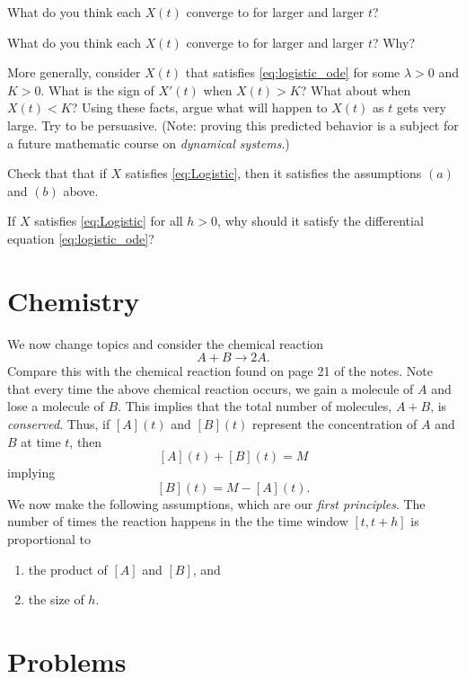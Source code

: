 What do you think each $X(t)$ converge to for larger and larger $t$?



\bigskip

\problemfont
\problem What do you think each $X(t)$ converge to for larger and
larger $t$?  Why?

\problem More generally, consider $X(t)$ that satisfies
\eqref{eq:logistic_ode} for some $\lambda> 0$ and $K>0$.  What is the
sign of $X'(t)$ when $X(t) > K$?  What about when $X(t) < K$?  Using
these facts, argue what will happen to $X(t)$ as $t$ gets very large.
Try to be persuasive.  (Note: proving this predicted behavior is a
subject for a future mathematic course on \textit{dynamical systems}.)

\problem Check that that if $X$ satisfies \eqref{eq:Logistic}, then it
satisfies the assumptions $(a)$ and $(b)$ above.

\problem If $X$ satisfies \eqref{eq:Logistic} for all $h>0$, why
should it satisfy the differential equation \eqref{eq:logistic_ode}?

\noproblemfont
\bigskip


\section{Chemistry}

We now change topics and consider the chemical reaction
\begin{equation*}
  A + B \to 2A.
\end{equation*}
Compare this with the chemical reaction found on page 21 of the notes.
Note that every time the above chemical reaction occurs, we gain a
molecule of $A$ and lose a molecule of $B$.  This implies that the
total number of molecules, $A + B$, is {\em conserved}.  Thus, if
$[A](t)$ and $[B](t)$ represent the concentration of $A$ and $B$ at
time $t$, then
\[
[A](t) + [B](t) = M
\]
implying
\begin{equation}\label{eq:noB}
  [B](t) = M-[A](t).
\end{equation}
We now make the following assumptions, which are our {\em first
principles}. The number of times the reaction happens in the the
time window $[t,t+h]$ is proportional to
\begin{enumerate}
\item the product of $[A]$ and $[B]$, and
\item the size of $h$.
\end{enumerate}

\section{Problems}

